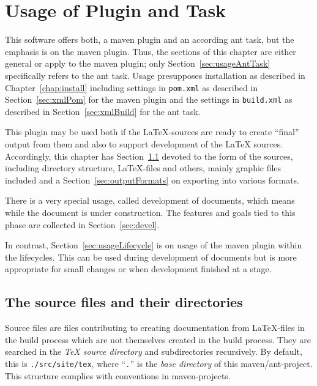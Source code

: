\chapter{Usage of Plugin and Task}\label{chap:usage}

This software offers both, a maven plugin and an according ant task,
but the emphasis is on the maven plugin.
Thus, the sections of this chapter are either general
or apply to the maven plugin;
only Section~\ref{sec:usageAntTask} specifically refers to the ant task. 
Usage presupposes installation as described in Chapter~\ref{chap:install}
including settings in \texttt{pom.xml} 
as described in Section~\ref{sec:xmlPom} for the maven plugin 
and the settings in \texttt{build.xml} 
as described in Section~\ref{sec:xmlBuild} for the ant task.

This plugin may be used both if the \LaTeX-sources are ready 
to create ``final'' output from them 
and also to support development of the \LaTeX{} sources. 
Accordingly, this chapter has Section~\ref{sec:sources}
devoted to the form of the sources, including directory structure,
\LaTeX-files and others, mainly graphic files included
and a Section~\ref{sec:outputFormats} on exporting into various formats.

There is a very special usage, called development of documents,
which means while the document is under construction.
The features and goals tied to this phase
are collected in Section~\ref{sec:devel}.

In contrast, Section~\ref{sec:usageLifecycle}
is on usage of the maven plugin within the lifecycles.
This can be used during development of documents
but is more appropriate for small changes
or when development finished at a stage. 


\section{The source files and their directories}\label{sec:sources}

Source files are files contributing to creating documentation 
from \LaTeX-files in the build process 
which are not themselves created in the build process. 
They are searched in the \emph{\TeX{} source directory} and subdirectories recursively. 
By default, this is \texttt{./src/site/tex}, 
where ``\texttt{.}'' is the \emph{base directory} of this maven/ant-project. 
This structure complies with conventions in maven-projects. 

